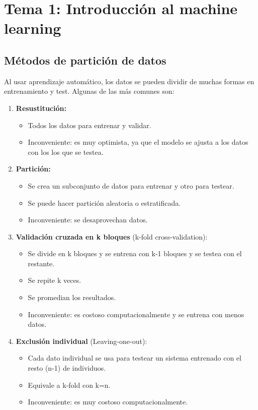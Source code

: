 \chapter{Tema 1: Introducción al machine learning}

\section{Métodos de partición de datos}

Al usar aprendizaje automático, los datos se pueden dividir de muchas
formas en entrenamiento y test. Algunas de las más comunes son:

\begin{enumerate}
    \item \textbf{Resustitución:}
    \begin{itemize}
        \item Todos los datos para entrenar y validar.
        \item Inconveniente: es muy optimista, ya que el modelo se ajusta
        a los datos con los los que se testea.
    \end{itemize}
    \item \textbf{Partición:}
    \begin{itemize}
        \item Se crea un subconjunto de datos para entrenar y otro para
        testear.
        \item Se puede hacer partición aleatoria o estratificada.
        \item Inconveniente: se desaprovechan datos.
    \end{itemize}
    \item \textbf{Validación cruzada en k bloques} (k-fold cross-validation):
    \begin{itemize}
        \item Se divide en k bloques y se entrena con k-1 bloques y se
        testea con el restante.
        \item Se repite k veces.
        \item Se promedian los resultados.
        \item Inconveniente: es costoso computacionalmente y se entrena
        con menos datos.
    \end{itemize}
    \item \textbf{Exclusión individual} (Leaving-one-out):
    \begin{itemize}
        \item Cada dato individual se usa para testear un sistema entrenado
        con el resto (n-1) de individuos.
        \item Equivale a k-fold con k=n.
        \item Inconveniente: es muy costoso computacionalmente.
    \end{itemize}
\end{enumerate}

